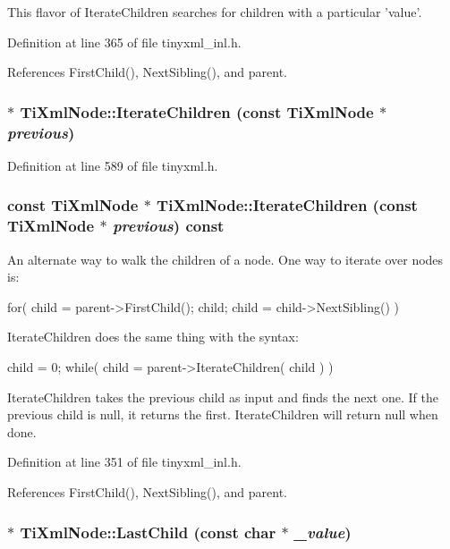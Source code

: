 This flavor of IterateChildren searches for children with a particular 'value'. 

Definition at line 365 of file tinyxml\_\-inl.h.

References FirstChild(), NextSibling(), and parent.\hypertarget{class_ti_xml_node_a2358e747118fdbf0e467b1e4f7d03de1}{
\subsubsection[{IterateChildren}]{$\ast$ TiXmlNode::IterateChildren (const {\bf TiXmlNode} $\ast$ {\em previous})}}
\label{class_ti_xml_node_a2358e747118fdbf0e467b1e4f7d03de1}


Definition at line 589 of file tinyxml.h.\hypertarget{class_ti_xml_node_aaef7ac3978c4bb1cc8a24ffae7bced75}{
\subsubsection[{IterateChildren}]{\setlength{\rightskip}{0pt plus 5cm}const {\bf TiXmlNode} $\ast$ TiXmlNode::IterateChildren (const {\bf TiXmlNode} $\ast$ {\em previous}) const}}
\label{class_ti_xml_node_aaef7ac3978c4bb1cc8a24ffae7bced75}
An alternate way to walk the children of a node. One way to iterate over nodes is: \begin{DoxyVerb}
      for( child = parent->FirstChild(); child; child = child->NextSibling() )
      \end{DoxyVerb}


IterateChildren does the same thing with the syntax: \begin{DoxyVerb}
      child = 0;
      while( child = parent->IterateChildren( child ) )
      \end{DoxyVerb}


IterateChildren takes the previous child as input and finds the next one. If the previous child is null, it returns the first. IterateChildren will return null when done. 

Definition at line 351 of file tinyxml\_\-inl.h.

References FirstChild(), NextSibling(), and parent.\hypertarget{class_ti_xml_node_abad5bf1059c48127b958711ef89e8e5d}{
\subsubsection[{LastChild}]{$\ast$ TiXmlNode::LastChild (const char $\ast$ {\em \_\-value})}}
\label{class_ti_xml_node_abad5bf1059c48127b958711ef89e8e5d}


